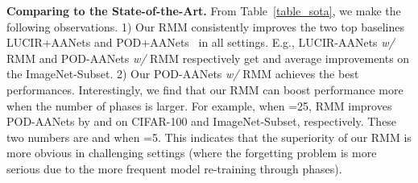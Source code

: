 \documentclass{article}
\newcommand{\myparagraph}[1]{\vspace{0.1em}\noindent\textbf{#1}}
\begin{document}
\myparagraph{Comparing to the State-of-the-Art.} From Table~\ref{table_sota}, we make the following observations. 1) Our RMM consistently improves the two top baselines LUCIR+AANets and POD+AANets~\cite{Liu2020AANets} in all settings. 
E.g., LUCIR-AANets \emph{w/} RMM and POD-AANets \emph{w/} RMM respectively get  and  average improvements on the ImageNet-Subset.
2) Our POD-AANets \emph{w/} RMM achieves the best performances. 
Interestingly, we find that our RMM can boost performance more when the number of phases is larger. For example, when =25, RMM improves POD-AANets by  and  on CIFAR-100 and ImageNet-Subset, respectively. These two numbers are  and  when =5. This indicates that the superiority of our RMM is more obvious in challenging settings (where the forgetting problem is more serious due to the more frequent model re-training through phases).
\end{document}
